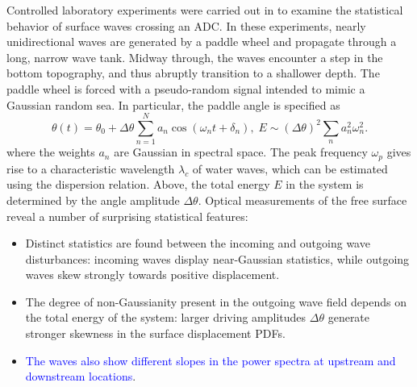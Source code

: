 \documentclass[9pt,twocolumn,twoside,lineno]{pnas-new}
\begin{document}
Controlled laboratory experiments were carried out in  \cite{bolles2018anomalous} to examine the statistical behavior of surface waves crossing an ADC. In these experiments, nearly unidirectional waves are generated by a paddle wheel and propagate through a long, narrow wave tank. Midway through, the waves encounter a step in the bottom topography, and thus abruptly transition to a shallower depth. The paddle wheel is forced with a pseudo-random signal intended to mimic a Gaussian random sea. In particular, the paddle angle is specified as
\[
\theta\left(t\right)=\theta_{0}+\Delta\theta\sum_{n=1}^{N}a_{n}\cos\left(\omega_{n}t+\delta_{n}\right),\;E\sim\left(\Delta\theta\right)^{2}\sum_{n}a_{n}^{2}\omega_{n}^{2}.
\]
where the weights $a_n$ are Gaussian in spectral space. The peak frequency $\omega_p$ gives rise to a characteristic wavelength $\lambda_c$ of water waves, which can be estimated using the dispersion relation.
Above, the total energy $E$ in the system is determined by the angle amplitude
$\Delta\theta$. Optical measurements of the free surface reveal a number of surprising statistical features:
\begin{itemize}
\item Distinct statistics are found between the incoming and outgoing wave
disturbances: incoming waves display near-Gaussian statistics,
while outgoing waves skew strongly towards positive displacement.
\item The degree of non-Gaussianity present in the outgoing wave field depends on the total energy of the system: 
larger driving amplitudes $\Delta\theta$ generate stronger skewness in the surface displacement PDFs.
\item \textcolor{blue}{The waves also show different slopes in the power spectra at upstream and downstream locations}.


\end{itemize}
\end{document}
